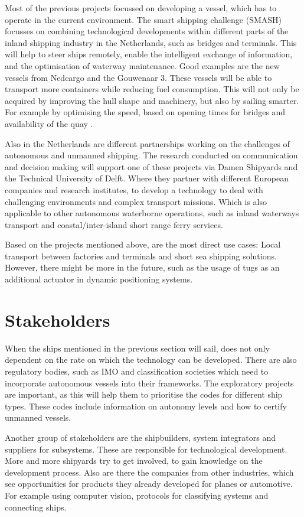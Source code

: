 Most of the previous projects focussed on developing a vessel, which has to operate in the current environment. The smart shipping challenge (SMASH) focusses on combining technological developments within different parts of the inland shipping industry in the Netherlands, such as bridges and terminals. This will help to steer ships remotely, enable the intelligent exchange of information, and the optimisation of waterway maintenance.
Good examples are the new vessels from Nedcargo and the Gouwenaar 3. These vessels will be able to transport more containers while reducing fuel consumption. This will not only be acquired by improving the hull shape and machinery, but also by sailing smarter. For example by optimising the speed, based on opening times for bridges and availability of the quay \cite{SMASH2017}. 

Also in the Netherlands are different partnerships working on the challenges of autonomous and unmanned shipping. The research conducted on communication and decision making will support one of these projects via Damen Shipyards and the Technical University of Delft. Where they partner with different European companies and research institutes, to develop a technology to deal with challenging environments and complex transport missions. Which is also applicable to other autonomous waterborne operations, such as inland waterways transport and coastal/inter-island short range ferry services.

Based on the projects mentioned above, are the most direct use cases: Local transport between factories and terminals and short sea shipping solutions. However, there might be more in the future, such as the usage of tugs as an additional actuator in dynamic positioning systems.

\section{Stakeholders}
When the ships mentioned in the previous section will sail, does not only dependent on the rate on which the technology can be developed. There are also regulatory bodies, such as \ac{IMO} and classification societies which need to incorporate autonomous vessels into their frameworks. 
The exploratory projects are important, as this will help them to prioritise the codes for different ship types. These codes include information on autonomy levels and how to certify unmanned vessels.

Another group of stakeholders are the shipbuilders, system integrators and suppliers for subsystems. These are responsible for technological development. More and more shipyards try to get involved, to gain knowledge on the development process. 
Also are there the companies from other industries, which see opportunities for products they already developed for planes or automotive. For example using computer vision, protocols for classifying systems and connecting ships.

